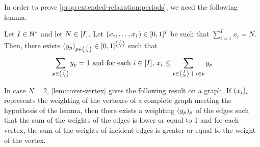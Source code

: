 In order to prove \cref{prop:extended-relaxation:periods}, we need the following lemma.

\begin{lem}\label{lem:cover-vertex}
Let $I\in\mathbb{N}^*$ and let $N\in\range{I}$.
Let $\bracket{x_i,\ldots,x_I}\in\sqbracket{0,1}^I$ be such that $\sum_{i=1}^I x_i = N$.
Then, there exists $\bracket{y_p}_{p\in{I\choose N}}\in\sqbracket{0,1}^{I\choose N}$ such that
\begin{equation}
  \sum_{p\in{I\choose N}}y_p = 1
  \ \mbox{and for each $i\in\range{I}$,}\ 
  x_i \le \sum_{p\in{I\choose N}~|~i\in p}y_p
\end{equation}
\end{lem}


\begin{rmq}
In case $N=2$, \cref{lem:cover-vertex} gives the following result on a graph.
If $\bracket{x_i}_i$ represents the weighting of the vertexes of a complete graph meeting the hypothesis of the lemma, then there exists a weighting $\bracket{y_p}_p$ of the edges such that the sum of the weights of the edges is lower or equal to 1 and for each vertex, the sum of the weights of incident edges is greater or equal to the weight of the vertex.
\end{rmq}




